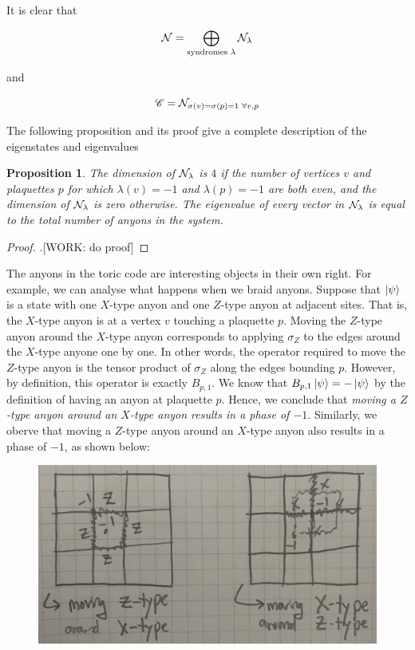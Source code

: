 \documentclass{article}
\newtheorem{proposition}{Proposition}[section]
\theoremstyle{definition}
\numberwithin{figure}{section}
\begin{document}
It is clear that

$$\mathcal{N}=\bigoplus_{\text{syndromes $\lambda$}}\mathcal{N}_\lambda$$

and

$$\mathscr{C}=\mathcal{N}_{\sigma(v)=\sigma(p)=1 \,\, \forall v,p}$$

The following proposition and its proof give a complete description of the eigenstates and eigenvalues

\begin{proposition}The dimension of $\mathcal{N}_{\lambda}$ is $4$ if the number of vertices $v$ and plaquettes $p$ for which $\lambda(v)=-1$ and $\lambda(p)=-1$ are both even, and the dimension of $\mathcal{N}_{\lambda}$ is zero otherwise. The eigenvalue of every vector in $\mathcal{N}_{\lambda}$ is equal to the total number of anyons in the system.
\end{proposition}
\begin{proof}.[WORK: do proof]
\end{proof}

The anyons in the toric code are interesting objects in their own right. For example, we can analyse what happens when we braid anyons. Suppose that $\ket{\psi}$ is a state with one $X$-type anyon and one $Z$-type anyon at adjacent sites. That is, the $X$-type anyon is at a vertex $v$ touching a plaquette $p$. Moving the $Z$-type anyon around the $X$-type anyon corresponds to applying $\sigma_Z$ to the edges around the $X$-type anyone one by one. In other words, the operator required to move the $Z$-type anyon is the tensor product of $\sigma_Z$ along the edges bounding $p$. However, by definition, this operator is exactly $B_{p,1}$. We know that $B_{p,1}\ket{\psi}=-\ket{\psi}$ by the definition of having an anyon at plaquette $p$. Hence, we conclude that \textit{moving a $Z$-type anyon around an $X$-type anyon results in a phase of $-1$}. Similarly, we oberve that moving a $Z$-type anyon around an $X$-type anyon also results in a phase of $-1$, as shown below:

\begin{figure}[h]
\begin{center}
\includegraphics[scale=.04]{mutual-anyon-stats}
\end{center}
\end{figure}
\end{document}
